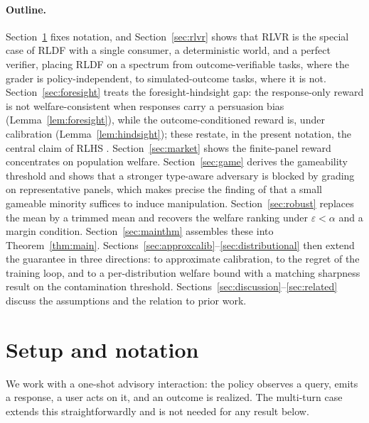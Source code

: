 \documentclass[11pt]{article}
\theoremstyle{plain}
\theoremstyle{definition}
\theoremstyle{remark}
\newcommand{\eps}{\varepsilon}
\begin{document}
\paragraph{Outline.}
Section~\ref{sec:setup} fixes notation, and Section~\ref{sec:rlvr} shows that RLVR is the special
case of RLDF with a single consumer, a deterministic world, and a perfect verifier, placing RLDF
on a spectrum from outcome-verifiable tasks, where the grader is policy-independent, to
simulated-outcome tasks, where it is not. Section~\ref{sec:foresight} treats the
foresight-hindsight gap: the response-only reward is not welfare-consistent when responses carry
a persuasion bias (Lemma~\ref{lem:foresight}), while the outcome-conditioned reward is, under
calibration (Lemma~\ref{lem:hindsight}); these restate, in the present notation, the central
claim of RLHS \cite{rlhs}. Section~\ref{sec:market} shows the finite-panel reward concentrates on
population welfare. Section~\ref{sec:game} derives the gameability threshold and shows that a
stronger type-aware adversary is blocked by grading on representative panels, which makes precise
the finding of \cite{williams} that a small gameable minority suffices to induce manipulation.
Section~\ref{sec:robust} replaces the mean by a trimmed mean and recovers the welfare ranking
under $\eps<\alpha$ and a margin condition. Section~\ref{sec:mainthm} assembles these into
Theorem~\ref{thm:main}. Sections~\ref{sec:approxcalib}--\ref{sec:distributional} then extend the
guarantee in three directions: to approximate calibration, to the regret of the training loop, and
to a per-distribution welfare bound with a matching sharpness result on the contamination
threshold. Sections~\ref{sec:discussion}--\ref{sec:related} discuss the assumptions and the
relation to prior work.


\section{Setup and notation}
\label{sec:setup}

We work with a one-shot advisory interaction: the policy observes a query, emits a response, a
user acts on it, and an outcome is realized. The multi-turn case extends this straightforwardly
and is not needed for any result below.
\end{document}
